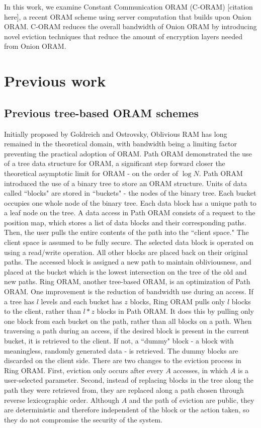\documentclass[12pt, oneside]{article}   	%
\begin{document}
In this work, we examine Constant Communication ORAM (C-ORAM) [citation here], a recent ORAM scheme using server computation that builds upon Onion ORAM. C-ORAM reduces the overall bandwidth of Onion ORAM by introducing novel eviction techniques that reduce the amount of encryption layers needed from Onion ORAM.



\section{Previous work}

\subsection{Previous tree-based ORAM schemes}
Initially proposed by Goldreich and Ostrovsky, Oblivious RAM has long remained in the theoretical domain, with bandwidth being a limiting factor preventing the practical adoption of ORAM. Path ORAM demonstrated the use of a tree data structure for ORAM, a significant step forward closer the theoretical asymptotic limit for ORAM - on the order of $\log N$. Path ORAM introduced the use of a binary tree to store an ORAM structure. Units of data called ``blocks" are stored in ``buckets" - the nodes of the binary tree. Each bucket occupies one whole node of the binary tree. Each data block has a unique path to a leaf node on the tree. A data access in Path ORAM consists of a request to the position map, which stores a list of data blocks and their corresponding paths. Then, the user pulls the entire contents of the path into the ``client space." The client space is assumed to be fully secure. The selected data block is operated on using a read/write operation. All other blocks are placed back on their original paths. The accessed block is assigned a new path to maintain obliviousness, and placed at the bucket which is the lowest intersection on the tree of the old and new paths. Ring ORAM, another tree-based ORAM, is an optimization of Path ORAM. One improvement is the reduction of bandwidth use during an access. If a tree has $l$ levels and each bucket has $z$ blocks, Ring ORAM pulls only $l$ blocks to the client, rather than $l*z$ blocks in Path ORAM. It does this by pulling only one block from each bucket on the path, rather than all blocks on a path. When traversing a path during an access, if the desired block is present in the current bucket, it is retrieved to the client. If not, a ``dummy" block - a block with meaningless, randomly generated data - is retrieved. The dummy blocks are discarded on the client side. There are two changes to the eviction process in Ring ORAM.  First, eviction only occurs after every $A$ accesses, in which $A$ is a user-selected parameter. Second, instead of replacing blocks in the tree along the path they were retrieved from, they are replaced along a path chosen through reverse lexicographic order. Although $A$ and the path of eviction are public, they are deterministic and therefore independent of the block or the action taken, so they do not compromise the security of the system.
\end{document}
